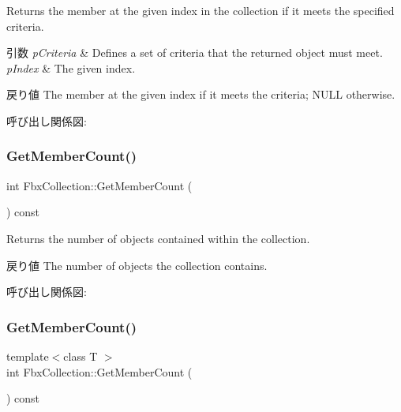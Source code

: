 Returns the member at the given index in the collection if it meets the specified criteria. 
\begin{DoxyParams}{引数}
{\em p\+Criteria} & Defines a set of criteria that the returned object must meet. \\
\hline
{\em p\+Index} & The given index. \\
\hline
\end{DoxyParams}
\begin{DoxyReturn}{戻り値}
The member at the given index if it meets the criteria; N\+U\+LL otherwise. 
\end{DoxyReturn}
呼び出し関係図\+:
\mbox{\label{class_fbx_collection_a3e22b8afd7b46dcc4988c2723dd75e02}} 
\subsubsection{\texorpdfstring{Get\+Member\+Count()}{GetMemberCount()}\hspace{0.1cm}{\footnotesize\ttfamily [1/3]}}
{\footnotesize\ttfamily int Fbx\+Collection\+::\+Get\+Member\+Count (\begin{DoxyParamCaption}{ }\end{DoxyParamCaption}) const}

Returns the number of objects contained within the collection. \begin{DoxyReturn}{戻り値}
The number of objects the collection contains. 
\end{DoxyReturn}
呼び出し関係図\+:
\mbox{\label{class_fbx_collection_a0bc6b29ae68a76d65c554c7217432cca}} 
\subsubsection{\texorpdfstring{Get\+Member\+Count()}{GetMemberCount()}\hspace{0.1cm}{\footnotesize\ttfamily [2/3]}}
{\footnotesize\ttfamily template$<$class T $>$ \\
int Fbx\+Collection\+::\+Get\+Member\+Count (\begin{DoxyParamCaption}{ }\end{DoxyParamCaption}) const}

